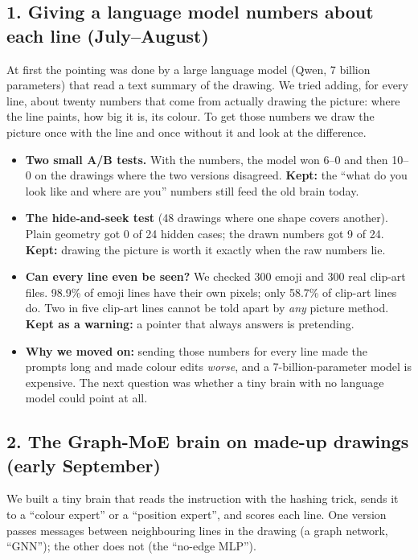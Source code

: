 \documentclass[11pt,a4paper]{article}
\begin{document}
\subsection*{1. Giving a language model numbers about each line (July--August)}

At first the pointing was done by a large language model (Qwen, 7 billion parameters) that read a text summary of the drawing.
We tried adding, for every line, about twenty numbers that come from actually drawing the picture: where the line paints, how big it is, its colour.
To get those numbers we draw the picture once with the line and once without it and look at the difference.

\begin{itemize}[leftmargin=1.6em]
  \item \textbf{Two small A/B tests.} With the numbers, the model won 6--0 and then 10--0 on the drawings where the two versions disagreed. \textbf{Kept:} the ``what do you look like and where are you'' numbers still feed the old brain today.
  \item \textbf{The hide-and-seek test} (48 drawings where one shape covers another). Plain geometry got 0 of 24 hidden cases; the drawn numbers got 9 of 24. \textbf{Kept:} drawing the picture is worth it exactly when the raw numbers lie.
  \item \textbf{Can every line even be seen?} We checked 300 emoji and 300 real clip-art files. 98.9\% of emoji lines have their own pixels; only 58.7\% of clip-art lines do. Two in five clip-art lines cannot be told apart by \emph{any} picture method. \textbf{Kept as a warning:} a pointer that always answers is pretending.
  \item \textbf{Why we moved on:} sending those numbers for every line made the prompts long and made colour edits \emph{worse}, and a 7-billion-parameter model is expensive. The next question was whether a tiny brain with no language model could point at all.
\end{itemize}

\subsection*{2. The Graph-MoE brain on made-up drawings (early September)}

We built a tiny brain that reads the instruction with the hashing trick, sends it to a ``colour expert'' or a ``position expert'', and scores each line.
One version passes messages between neighbouring lines in the drawing (a graph network, ``GNN''); the other does not (the ``no-edge MLP'').
\end{document}
